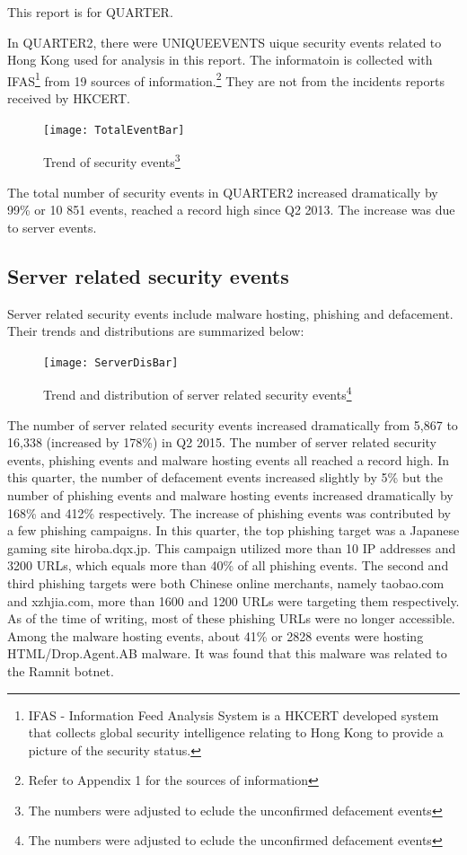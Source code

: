 \documentclass[12pt]{article}
\begin{document}
This report is for QUARTER.

In QUARTER2, there were UNIQUEEVENTS uique security events related to Hong Kong used for analysis in this report. The informatoin is collected with IFAS\footnote{IFAS - Information Feed Analysis System is a HKCERT developed system that collects global security intelligence relating to Hong Kong to provide a picture of the security status.} from 19 sources of information.\footnote{Refer to Appendix 1 for the sources of information} They are not from the incidents reports received by HKCERT.

\begin{figure}[h!]
\centerline{\texttt{[image: TotalEventBar]}}
\caption{Trend of security events{\protect\footnote{The numbers were adjusted to eclude the unconfirmed defacement events}}}
\end{figure}

The total number of security events in QUARTER2 increased dramatically by 99\% or 10 851 events, reached a record high since Q2 2013. The increase was due to server events.

\subsection*{Server related security events}

Server related security events include malware hosting, phishing and defacement. Their trends and distributions are summarized below:

\begin{figure}[h!]
\centerline{\texttt{[image: ServerDisBar]}}
\caption{Trend and distribution of server related security events{\protect\footnote{The numbers were adjusted to eclude the unconfirmed defacement events}}}
\end{figure}

The number of server related security events increased dramatically from 5,867 to 16,338 
(increased by 178\%) in Q2 2015. The number of server related security events, phishing events 
and malware hosting events all reached a record high. 
In this quarter, the number of defacement events increased slightly by 5\% but the number of 
phishing  events  and  malware  hosting  events  increased  dramatically  by  168\%  and  412\% 
respectively. 
The increase of phishing events was contributed by a few phishing campaigns. In this quarter, 
the top phishing target was a Japanese gaming site hiroba.dqx.jp. This campaign utilized more 
than 10 IP addresses and 3200 URLs, which equals more than 40\% of all phishing events. The 
second and third phishing targets were both Chinese online merchants, namely taobao.com 
and xzhjia.com, more than 1600 and 1200 URLs were targeting them respectively. As of the 
time of writing, most of these phishing URLs were no longer accessible. 
Among the malware hosting events, about 41\% or 2828 events were hosting 
HTML/Drop.Agent.AB malware. It was found that this malware was related to the Ramnit 
botnet.
\end{document}
